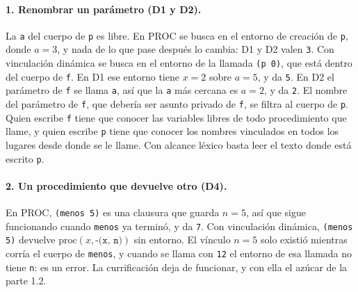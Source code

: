 \documentclass[a4paper, 10pt]{article}
\newcommand{\ttt}[1]{\texttt{#1}}
\begin{document}
\paragraph{1. Renombrar un parámetro (D1 y D2).}
La \ttt{a} del cuerpo de \ttt{p} es libre. En PROC se busca en el entorno de creación de
\ttt{p}, donde $a=3$, y nada de lo que pase después lo cambia: D1 y D2 valen \ttt{3}. Con
vinculación dinámica se busca en el entorno de la llamada \ttt{(p 0)}, que está dentro del
cuerpo de \ttt{f}. En D1 ese entorno tiene $x=2$ sobre $a=5$, y da \ttt{5}. En D2 el
parámetro de \ttt{f} se llama \ttt{a}, así que la \ttt{a} más cercana es $a=2$, y da
\ttt{2}. El nombre del parámetro de \ttt{f}, que debería ser asunto privado de \ttt{f},
se filtra al cuerpo de \ttt{p}. Quien escribe \ttt{f} tiene que conocer las variables
libres de todo procedimiento que llame, y quien escribe \ttt{p} tiene que conocer los
nombres vinculados en todos los lugares desde donde se le llame. Con alcance léxico basta
leer el texto donde está escrito \ttt{p}.

\paragraph{2. Un procedimiento que devuelve otro (D4).}
En PROC, \ttt{(menos 5)} es una clausura que guarda $n=5$, así que sigue funcionando
cuando \ttt{menos} ya terminó, y da \ttt{7}. Con vinculación dinámica,
\ttt{(menos 5)} devuelve $\mathrm{proc}(x, \ttt{-(x, n)})$ sin entorno. El vínculo
$n=5$ solo existió mientras corría el cuerpo de \ttt{menos}, y cuando se llama con
\ttt{12} el entorno de esa llamada no tiene \ttt{n}: es un error. La currificación
deja de funcionar, y con ella el azúcar de la parte 1.2.
\end{document}
